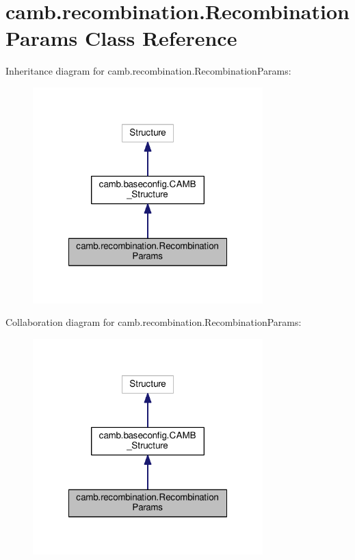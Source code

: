 \hypertarget{classcamb_1_1recombination_1_1RecombinationParams}{}\section{camb.\+recombination.\+Recombination\+Params Class Reference}
\label{classcamb_1_1recombination_1_1RecombinationParams}


Inheritance diagram for camb.\+recombination.\+Recombination\+Params\+:
\nopagebreak
\begin{figure}[H]
\begin{center}
\leavevmode
\includegraphics[width=252pt]{classcamb_1_1recombination_1_1RecombinationParams__inherit__graph}
\end{center}
\end{figure}


Collaboration diagram for camb.\+recombination.\+Recombination\+Params\+:
\nopagebreak
\begin{figure}[H]
\begin{center}
\leavevmode
\includegraphics[width=252pt]{classcamb_1_1recombination_1_1RecombinationParams__coll__graph}
\end{center}
\end{figure}
